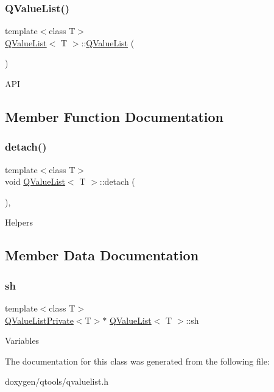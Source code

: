 \subsubsection{\texorpdfstring{QValueList()}{QValueList()}}
{\footnotesize\ttfamily template$<$class T$>$ \\
\mbox{\hyperlink{class_q_value_list}{Q\+Value\+List}}$<$ T $>$\+::\mbox{\hyperlink{class_q_value_list}{Q\+Value\+List}} (\begin{DoxyParamCaption}{ }\end{DoxyParamCaption})\hspace{0.3cm}{\ttfamily [inline]}}

A\+PI 

\subsection{Member Function Documentation}
\mbox{\label{class_q_value_list_a8058c18bd44bd75b72947e2db636689b}} 
\subsubsection{\texorpdfstring{detach()}{detach()}}
{\footnotesize\ttfamily template$<$class T$>$ \\
void \mbox{\hyperlink{class_q_value_list}{Q\+Value\+List}}$<$ T $>$\+::detach (\begin{DoxyParamCaption}{ }\end{DoxyParamCaption})\hspace{0.3cm}{\ttfamily [inline]}, {\ttfamily [protected]}}

Helpers 

\subsection{Member Data Documentation}
\mbox{\label{class_q_value_list_a98d0ae49f314645c094e61a1d2c1264c}} 
\subsubsection{\texorpdfstring{sh}{sh}}
{\footnotesize\ttfamily template$<$class T$>$ \\
\mbox{\hyperlink{class_q_value_list_private}{Q\+Value\+List\+Private}}$<$T$>$$\ast$ \mbox{\hyperlink{class_q_value_list}{Q\+Value\+List}}$<$ T $>$\+::sh\hspace{0.3cm}{\ttfamily [protected]}}

Variables 

The documentation for this class was generated from the following file\+:\begin{DoxyCompactItemize}
\item 
doxygen/qtools/qvaluelist.\+h\end{DoxyCompactItemize}
